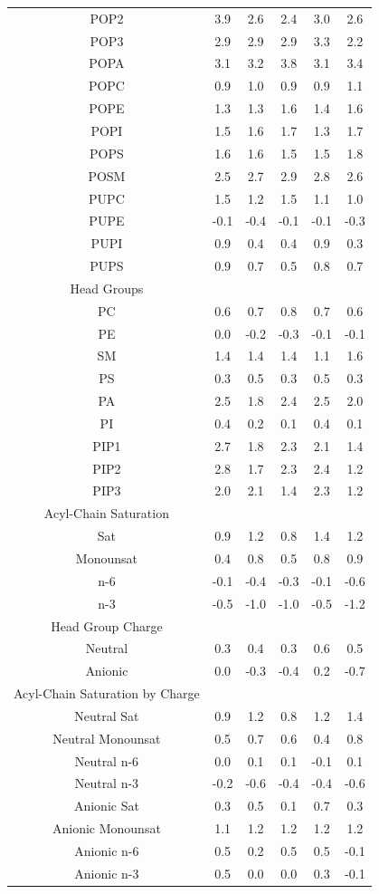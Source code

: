 \documentclass[12pt]{ruthesis_nofloat}
\begin{document}
\begin{table}
{\begin{tabular}{| c || ccccc |}
POP2&3.9&2.6&2.4&3.0&2.6        \\
POP3&2.9&2.9&2.9&3.3&2.2        \\
POPA    &3.1&3.2&3.8&3.1&3.4        \\
POPC    &0.9&1.0&0.9&0.9&1.1        \\
POPE    &1.3&1.3&1.6&1.4&1.6        \\
POPI    &1.5&1.6&1.7&1.3&1.7        \\
POPS    &1.6&1.6&1.5&1.5&1.8        \\
POSM    &2.5&2.7&2.9&2.8&2.6        \\
PUPC    &1.5&1.2&1.5&1.1&1.0        \\
PUPE    &-0.1&-0.4&-0.1&-0.1&-0.3       \\
PUPI    &0.9&0.4&0.4&0.9&0.3        \\
PUPS    &0.9&0.7&0.5&0.8&0.7        \\
\hline
Head Groups &&&&&\\
PC      &0.6&0.7&0.8&0.7&0.6        \\
PE      &0.0&-0.2&-0.3&-0.1&-0.1       \\
SM      &1.4&1.4&1.4&1.1&1.6        \\
PS      &0.3&0.5&0.3&0.5&0.3        \\
PA      &2.5&1.8&2.4&2.5&2.0        \\
PI      &0.4&0.2&0.1&0.4&0.1        \\
PIP1&2.7&1.8&2.3&2.1&1.4        \\
PIP2&2.8&1.7&2.3&2.4&1.2        \\
PIP3&2.0&2.1&1.4&2.3&1.2        \\
\hline
Acyl-Chain Saturation &&&&&\\
Sat      &0.9&1.2&0.8&1.4&1.2        \\
Monounsat      &0.4&0.8&0.5&0.8&0.9        \\
n-6&-0.1&-0.4&-0.3&-0.1&-0.6       \\
n-3&-0.5&-1.0&-1.0&-0.5&-1.2       \\
\hline
Head Group Charge  &&&&&\\
Neutral &0.3&0.4&0.3&0.6&0.5        \\
Anionic &0.0&-0.3&-0.4&0.2&-0.7      \\
\hline
Acyl-Chain Saturation by Charge &&&&&\\
Neutral Sat    &0.9&1.2&0.8&1.2&1.4        \\
Neutral Monounsat    &0.5&0.7&0.6&0.4&0.8        \\
Neutral n-6&0.0&0.1&0.1&-0.1&0.1        \\
Neutral n-3&-0.2&-0.6&-0.4&-0.4&-0.6       \\
Anionic Sat     &0.3&0.5&0.1&0.7&0.3        \\
Anionic Monounsat    &1.1&1.2&1.2&1.2&1.2        \\
Anionic n-6&0.5&0.2&0.5&0.5&-0.1       \\
Anionic n-3&0.5&0.0&0.0&0.3&-0.1       \\\hline
\end{tabular}}
\end{table}
\end{document}
